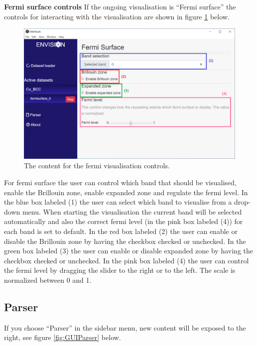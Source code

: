 \textbf{Fermi surface controls}
\newline
If the ongoing visualisation is ``Fermi surface'' the controls for interacting with the visualisation are shown in figure \ref{fig:GUIFermi} below.

\begin{figure}[H]
    \centering
    \includegraphics[scale = 0.45]{Images/GUI_Fermicontent.png}
    \caption{The content for the fermi visualisation controls.}
    \label{fig:GUIFermi}
\end{figure}

For fermi surface the user can control which band that should be visualised, enable the Brillouin zone, enable expanded zone and regulate the fermi level. In the blue box labeled (1) the user can select which band to visualise from a drop-down menu. When starting the visualisation the current band will be selected automatically and also the correct fermi level (in the pink box labeled (4)) for each band is set to default. In the red box labeled (2) the user can enable or disable the Brillouin zone by having the checkbox checked or unchecked. In the green box labeled (3) the user can enable or disable expanded zone by having the checkbox checked or unchecked. In the pink box labeled (4) the user can control the fermi level by dragging the slider to the right or to the left. The scale is normalized between 0 and 1.

\subsection{Parser}
If you choose ``Parser'' in the sidebar menu, new content will be exposed to the right, see figure \ref{fig:GUIParser} below. 

